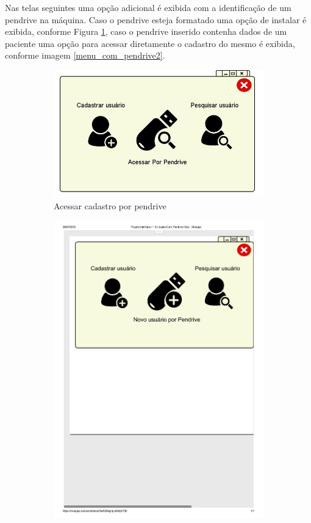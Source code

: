 \documentclass[12pt]{article}
\begin{document}
Nas telas seguintes uma opção adicional é exibida com a identificação de um pendrive na máquina. Caso o pendrive esteja formatado uma opção de instalar é exibida, conforme Figura \ref{menu_com_pendrive1}, caso o pendrive inserido contenha dados de um paciente uma opção para acessar diretamente o cadastro do mesmo é exibida, conforme imagem \ref{menu_com_pendrive2}.
\begin{figure}[h]
\begin{subfigure}{0.5\textwidth}
\includegraphics[scale=0.3]{imagens/1-1Usuarios_Com_Pendrive.jpg}
\caption{Acessar cadastro por pendrive}
\label{menu_com_pendrive1}
\end{subfigure}
\begin{subfigure}{0.5\textwidth}
\includegraphics[scale=0.3]{imagens/1-3ProjetoInterface_1-3UsuaioComPendriveVazio.pdf} 

\end{subfigure}
\end{figure}
\end{document}
